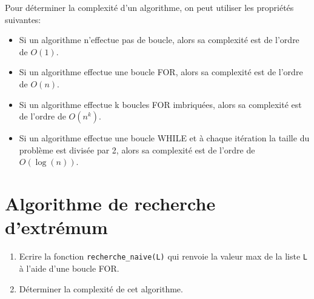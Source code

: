 \begin{propriete}{}
	Pour déterminer la complexité d'un algorithme, on peut utiliser les propriétés suivantes:

	\begin{itemize}
		\item Si un algorithme n'effectue pas de boucle, alors sa complexité est de l'ordre de $O(1)$.
		\item Si un algorithme effectue une boucle FOR, alors sa complexité est de l'ordre de $O(n)$.
		\item Si un algorithme effectue k boucles FOR imbriquées, alors sa complexité est de l'ordre de $O(n^k)$.
		\item Si un algorithme effectue une boucle WHILE et à chaque itération la taille du problème est divisée par 2, alors sa complexité est de l'ordre de $O(\log(n))$.
	\end{itemize}
\end{propriete}


\section{Algorithme de recherche d'extrémum}


\begin{exercice_cours}{}

	\begin{enumerate}
		\item 	Ecrire la fonction \verb|recherche_naive(L)| qui renvoie la valeur max de la liste \verb|L| à l'aide d'une boucle FOR. 
		\item Déterminer la complexité de cet algorithme.
	\end{enumerate}
\end{exercice_cours}

